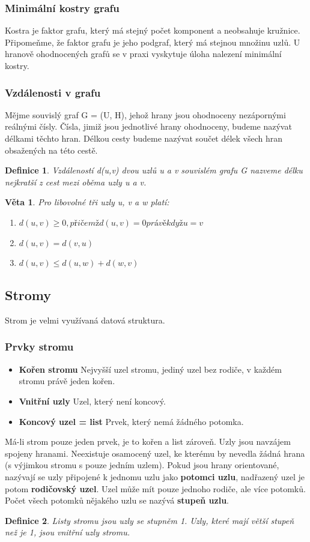 \documentclass[10pt,a4paper]{article}
\newtheorem{veta}{Věta}
\newtheorem{definition}{Definice}
\begin{document}
\subsubsection{Minimální kostry grafu}
Kostra je faktor grafu, který má stejný počet komponent a neobsahuje kružnice.
Připomeňme, že faktor grafu je jeho podgraf, který má stejnou množinu uzlů.
U hranově ohodnocených grafů se v praxi vyskytuje úloha nalezení minimální kostry.
\subsubsection{Vzdálenosti v grafu}
Mějme souvislý graf G = (U, H), jehož hrany jsou ohodnoceny nezápornými reálnými čísly. Čísla, jimiž jsou jednotlivé hrany ohodnoceny, budeme nazývat délkami těchto hran. Délkou cesty budeme nazývat součet délek všech hran obsažených na této cestě.
\begin{definition}
Vzdáleností d(u,v) dvou uzlů u a v souvislém grafu G nazveme délku nejkratší z cest mezi oběma uzly u a v.
\end{definition}
\begin{veta}
Pro libovolné tři uzly u, v a w platí:
\begin{enumerate}
	\item $d(u, v) \geq 0, přičemž d(u, v) = 0 právě když u = v$
	\item $d(u, v) = d(v, u)$
	\item $d(u, v) \leq d(u, w) + d(w, v)$
\end{enumerate}
\end{veta}




\subsection{Stromy}
Strom je velmi využívaná datová struktura.
\subsubsection{Prvky stromu}
\begin{itemize}
	\item \textbf{Kořen stromu} Nejvyšší uzel stromu, jediný uzel bez rodiče, v každém stromu právě jeden kořen.
	\item \textbf{Vnitřní uzly} Uzel, který není koncový.
	\item \textbf{Koncový uzel = list} Prvek, který nemá žádného potomka.
\end{itemize}
Má-li strom pouze jeden prvek, je to kořen a list zároveň. Uzly jsou navzájem spojeny hranami. Neexistuje osamocený uzel, ke kterému by nevedla žádná hrana (s výjimkou stromu s pouze jedním uzlem). Pokud jsou hrany orientované, nazývají se uzly připojené k jednomu uzlu jako \textbf{potomci uzlu}, nadřazený uzel je potom \textbf{rodičovský uzel}. Uzel může mít pouze jednoho rodiče, ale více potomků. Počet všech potomků nějakého uzlu se nazývá \textbf{stupeň uzlu}.
\begin{definition}
Listy stromu jsou uzly se stupněm 1. Uzly, které mají větší stupeň než je 1, jsou vnitřní uzly stromu.
\end{definition}
\end{document}
